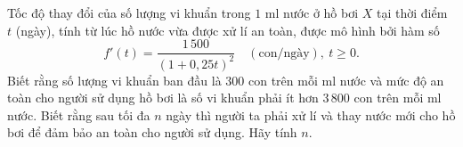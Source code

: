 \begin{ex}%
	Tốc độ thay đổi của số lượng vi khuẩn trong $1$ ml nước ở hồ bơi $X$ tại thời điểm $t$ (ngày), tính từ lúc hồ nước vừa được xử lí an toàn, được mô hình bởi hàm số
	\[
	f'(t)=\dfrac{1\,500}{(1+0{,}25t)^2}\quad (\text{con/ngày}),\ t\ge 0.
	\]
	Biết rằng số lượng vi khuẩn ban đầu là $300$ con trên mỗi ml nước và mức độ an toàn cho người sử dụng hồ bơi là số vi khuẩn phải ít hơn $3\,800$ con trên mỗi ml nước. Biết rằng sau tối đa $n$ ngày thì người ta phải xử lí và thay nước mới cho hồ bơi để đảm bảo an toàn cho người sử dụng. Hãy tính $n$.
	\par{}
\end{ex}

